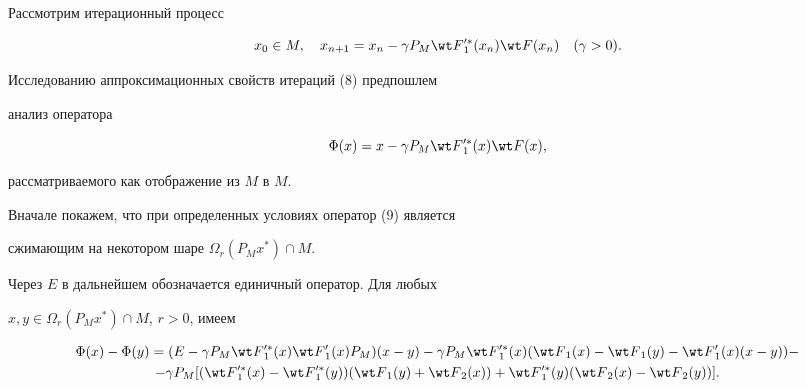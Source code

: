  


Рассмотрим итерационный процесс


\begin{equation}


x_0 \in M, \quad x_{n+1}=x_n-


\gamma P_M {\wt F}{}_1^{\prime *}(x_n) {\wt F}(x_n)


\quad (\gamma>0).


\end{equation}





Исследованию аппроксимационных свойств итераций (8) предпошлем


анализ оператора


\begin{equation}


\Phi(x)=x-


\gamma P_M {\wt F}{}_1^{\prime *}(x) {\wt F}(x),


\end{equation}


рассматриваемого как отображение из $M$ в $M$.


Вначале покажем, что при определенных условиях оператор (9) является


сжимающим на некотором шаре $\Omega_r(P_M x^*) \cap M$.


Через $E$ в дальнейшем обозначается единичный оператор. Для любых


$x, y \in \Omega_r(P_M x^*) \cap M$, $r>0$, имеем


\begin{gather}


\Phi(x)-\Phi(y)=(E-\gamma P_M {\wt F}{}_1^{\prime *}(x)


{\wt F}{}_1^{\prime}(x) P_M)(x-y)-




\gamma P_M {\wt F}{}_1^{\prime *}(x)


({\wt F}_1 (x)- {\wt F}_1 (y)-{\wt F}{}_1^{\prime}(x)(x-y) )-\notag\\


%


-\gamma P_M [


({\wt F}{}_1^{\prime *}(x)-{\wt F}{}_1^{\prime *}(y))


({\wt F}_1 (y)+ {\wt F}_2 (x))+


{\wt F}{}_1^{\prime *} (y)


({\wt F}_2 (x)-{\wt F}_2 (y)) ].


\end{gather}


